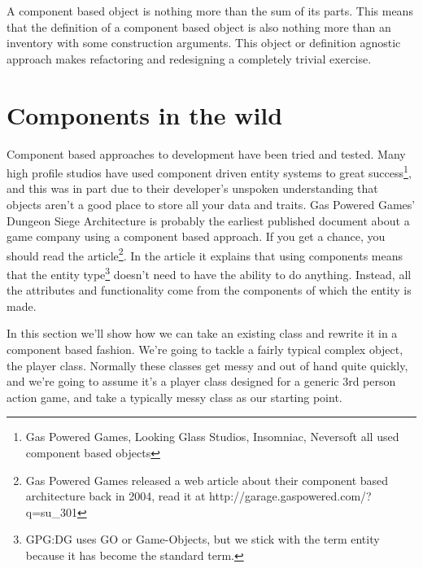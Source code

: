 A component based object is nothing more than the sum of its parts. This means
that the definition of a component based object is also nothing more than an
inventory with some construction arguments.  This object or definition agnostic
approach makes refactoring and redesigning a completely trivial exercise.

\section{Components in the wild}

Component based approaches to development have been tried and tested. Many high
profile studios have used component driven entity systems to great
success\footnote{Gas Powered Games, Looking Glass Studios, Insomniac, Neversoft
all used component based objects}, and this was in part due to their developer's
unspoken understanding that objects aren't a good place to store all your data
and traits. Gas Powered Games' Dungeon Siege Architecture is probably the
earliest published document about a game company using a component based
approach. If you get a chance, you should read the article\footnote{Gas Powered
Games released a web article about their component based architecture back in
2004, read it at http://garage.gaspowered.com/?q=su\_301}. In the article it
explains that using components means that the entity type\footnote{GPG:DG uses
GO or Game-Objects, but we stick with the term entity because it has become the
standard term.} doesn't need to have the ability to do anything. Instead, all
the attributes and functionality come from the components of which the entity
is made.

In this section we'll show how we can take an existing class and rewrite it in
a component based fashion. We're going to tackle a fairly typical complex
object, the player class. Normally these classes get messy and out of hand
quite quickly, and we're going to assume it's a player class designed for a
generic 3rd person action game, and take a typically messy class as our
starting point.

